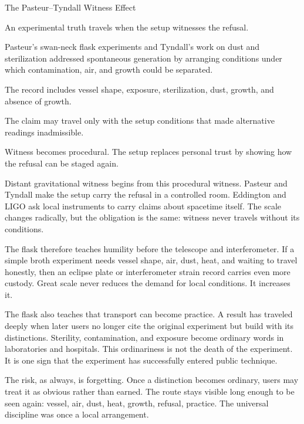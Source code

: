 \begin{phenom}{The Pasteur--Tyndall Witness Effect~\cite{pasteur1861,tyndall1877}}
\label{ph:pasteur-tyndall-witness}

\PhStatement
An experimental truth travels when the setup witnesses the refusal.

\PhOrigin
Pasteur's swan-neck flask experiments and Tyndall's work on dust and
sterilization addressed spontaneous generation by arranging conditions under
which contamination, air, and growth could be separated.

\PhObservation
The record includes vessel shape, exposure, sterilization, dust, growth, and
absence of growth.

\PhConstraint
The claim may travel only with the setup conditions that made alternative
readings inadmissible.

\PhConsequence
Witness becomes procedural. The setup replaces personal trust by showing how
the refusal can be staged again.
\end{phenom}

Distant gravitational witness begins from this procedural witness. Pasteur
and Tyndall make the setup carry the refusal in a controlled room. Eddington
and LIGO ask local instruments to carry claims about spacetime itself. The
scale changes radically, but the obligation is the same: witness never
travels without its conditions.

The flask therefore teaches humility before the telescope and interferometer.
If a simple broth experiment needs vessel shape, air, dust, heat, and waiting
to travel honestly, then an eclipse plate or interferometer strain record
carries even more custody. Great scale never reduces the demand for local
conditions. It increases it.

The flask also teaches that transport can become practice. A result has
traveled deeply when later users no longer cite the original experiment but
build with its distinctions. Sterility, contamination, and exposure become
ordinary words in laboratories and hospitals. This ordinariness is not the
death of the experiment. It is one sign that the experiment has successfully
entered public technique.

The risk, as always, is forgetting. Once a distinction becomes ordinary,
users may treat it as obvious rather than earned. The route stays visible
long enough to be seen again: vessel, air, dust, heat, growth, refusal,
practice. The universal discipline was once a local arrangement.

